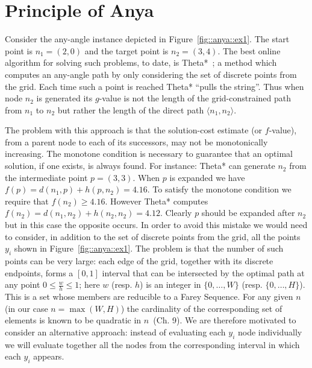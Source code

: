 \section{Principle of Anya}
Consider the any-angle instance depicted in Figure~\ref{fig::anya::ex1}. 
The start point is $n_1 = (2, 0)$ and the target
point is $n_2 = (3, 4)$.  The best online algorithm for solving such
problems, to date, is Theta*~\citep{nash07}; a method which computes
an any-angle path by only considering the set of discrete points from 
the grid. 
Each time such a point is reached Theta* ``pulls the string''.  
Thus when node $n_2$ is generated its $g$-value is not
the length of the grid-constrained path from $n_1$ to $n_2$
but rather the length of the direct path $\langle n_1, n_2 \rangle$.

%    

The problem with this approach is that the solution-cost estimate
(or $f$-value), from a parent node to each of its successors, may 
not be monotonically increasing.  The monotone condition is
necessary to guarantee that an optimal solution, if one exists, is always found.
For instance: Theta* can generate $n_2$ from the intermediate point $p = (3,3)$.
When $p$ is expanded we have $f(p) = d(n_1, p) + h(p, n_2) = 4.16$. 
To satisfy the monotone condition we require that $f(n_2) \geq 4.16$. However 
Theta* computes $f(n_2) = d(n_1, n_2) + h(n_2, n_2) = 4.12$.
Clearly $p$ should be expanded after $n_2$ but in this case the opposite occurs.  
In order to avoid this mistake we would need to consider, in addition to the
set of discrete points from the grid, all the points $y_i$ shown in Figure~\ref{fig::anya::ex1}.
The problem is that the number of such points can be very large:
each edge of the grid, together with its discrete endpoints, 
forms a $[0, 1]$ interval that can be intersected by the optimal
path at any point $0 \leq \frac{w}{h} \leq 1$; here $w$ (resp. $h$) is an integer in
$\{0,\dots,W\}$ (resp.  $\{0,\dots,H\}$).
This is a set whose members are reducible to a Farey Sequence.
For any given $n$ (in our case $n = \max(W, H)$) the cardinality of the corresponding 
set of elements is known to be quadratic in $n$~\citep{concrete89}(Ch. 9).
We are therefore motivated to consider an alternative approach: instead
of evaluating each $y_i$ node individually we will evaluate together
all the nodes from the corresponding interval in which each $y_i$ appears.


